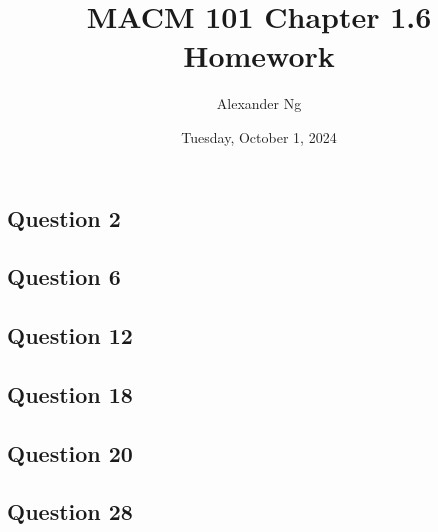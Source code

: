 \documentclass[12pt]{article}
\begin{document}
\title{MACM 101 Chapter 1.6 Homework}
\author{Alexander Ng}
\date{Tuesday, October 1, 2024}

\maketitle

\subsection*{Question 2}
\subsection*{Question 6}
\subsection*{Question 12}
\subsection*{Question 18}
\subsection*{Question 20}
\subsection*{Question 28}
\end{document}
